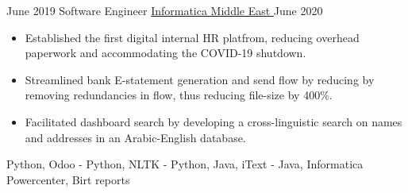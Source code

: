 \begin{experiences}
    \experience
        {June 2019}
        {Software Engineer}
        {\href{https://www.linkedin.com/company/infme.com/}{Informatica Middle East \faExternalLink}}
        {June 2020}
        {
            \begin{itemize}
                \item Established the first digital internal HR platfrom, reducing  overhead paperwork and accommodating the COVID-19 shutdown.
                \item Streamlined bank E-statement generation and send flow by reducing by removing redundancies in flow, thus reducing file-size by 400\%.
                \item Facilitated dashboard search by developing a cross-linguistic search on names and addresses in an Arabic-English database.
            \end{itemize}
        }
        {
            Python,
            Odoo - Python,
            NLTK - Python,
            Java,
            iText - Java,
            Informatica Powercenter,
            Birt reports
        }
\end{experiences}
